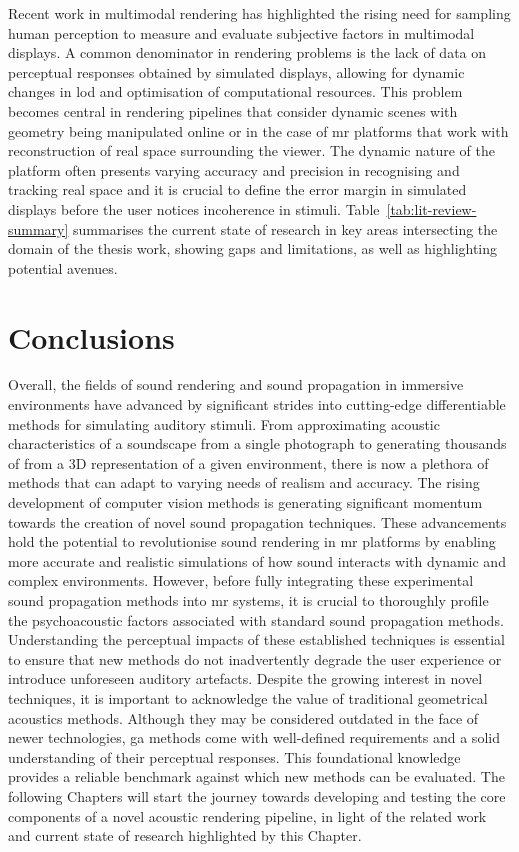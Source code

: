 Recent work in multimodal rendering has highlighted the rising need for sampling human perception to measure and evaluate subjective factors in multimodal displays. A common denominator in rendering problems is the lack of data on perceptual responses obtained by simulated displays, allowing for dynamic changes in \acrshort{lod} and optimisation of computational resources. This problem becomes central in rendering pipelines that consider dynamic scenes with geometry being manipulated online or in the case of \acrshort{mr} platforms that work with reconstruction of real space surrounding the viewer. The dynamic nature of the platform often presents varying accuracy and precision in recognising and tracking real space and it is crucial to define the error margin in simulated displays before the user notices incoherence in stimuli.
Table~\ref{tab:lit-review-summary} summarises the current state of research in key areas intersecting the domain of the thesis work, showing gaps and limitations, as well as highlighting potential avenues.

\section{Conclusions}
Overall, the fields of sound rendering and sound propagation in immersive environments have advanced by significant strides into cutting-edge differentiable methods for simulating auditory stimuli. From approximating acoustic characteristics of a soundscape from a single photograph to generating thousands of  from a 3D representation of a given environment, there is now a plethora of methods that can adapt to varying needs of realism and accuracy.
The rising development of computer vision methods is generating significant momentum towards the creation of novel sound propagation techniques. These advancements hold the potential to revolutionise sound rendering in \acrshort{mr} platforms by enabling more accurate and realistic simulations of how sound interacts with dynamic and complex environments. However, before fully integrating these experimental sound propagation methods into \acrshort{mr} systems, it is crucial to thoroughly profile the psychoacoustic factors associated with standard sound propagation methods. Understanding the perceptual impacts of these established techniques is essential to ensure that new methods do not inadvertently degrade the user experience or introduce unforeseen auditory artefacts.
Despite the growing interest in novel techniques, it is important to acknowledge the value of traditional geometrical acoustics methods. Although they may be considered outdated in the face of newer technologies, \acrshort{ga} methods come with well-defined requirements and a solid understanding of their perceptual responses. This foundational knowledge provides a reliable benchmark against which new methods can be evaluated. The following Chapters will start the journey towards developing and testing the core components of a novel acoustic rendering pipeline, in light of the related work and current state of research highlighted by this Chapter.
